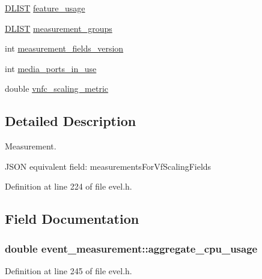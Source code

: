 \begin{DoxyCompactItemize}
\item 
\hyperlink{double__list_8h_a45f4a129042d9e1aa4ffd31fe13e4d14}{D\+L\+I\+S\+T} \hyperlink{structevent__measurement_a3bdd3e143db79d5ffc5b24cb875d3088}{feature\+\_\+usage}
\item 
\hyperlink{double__list_8h_a45f4a129042d9e1aa4ffd31fe13e4d14}{D\+L\+I\+S\+T} \hyperlink{structevent__measurement_a1d2ba76652e34cc7e4598187d55d72f7}{measurement\+\_\+groups}
\item 
int \hyperlink{structevent__measurement_a07a49b5189c9a8c8e81989a5288ad4f6}{measurement\+\_\+fields\+\_\+version}
\item 
int \hyperlink{structevent__measurement_a9789b096607aabab608fb9e223b247ef}{media\+\_\+ports\+\_\+in\+\_\+use}
\item 
double \hyperlink{structevent__measurement_a4ac08dcf75a2eea41953666645bc4f33}{vnfc\+\_\+scaling\+\_\+metric}
\end{DoxyCompactItemize}


\subsection{Detailed Description}
Measurement. 

J\+S\+O\+N equivalent field\+: measurements\+For\+Vf\+Scaling\+Fields 

Definition at line 224 of file evel.\+h.



\subsection{Field Documentation}
\hypertarget{structevent__measurement_a12456548ea1cb226b0e6d6a515732f9c}{}
\subsubsection[{aggregate\+\_\+cpu\+\_\+usage}]{\setlength{\rightskip}{0pt plus 5cm}double event\+\_\+measurement\+::aggregate\+\_\+cpu\+\_\+usage}\label{structevent__measurement_a12456548ea1cb226b0e6d6a515732f9c}


Definition at line 245 of file evel.\+h.

\hypertarget{structevent__measurement_a9ef619061bb0185c063ede94a114a73c}{}
